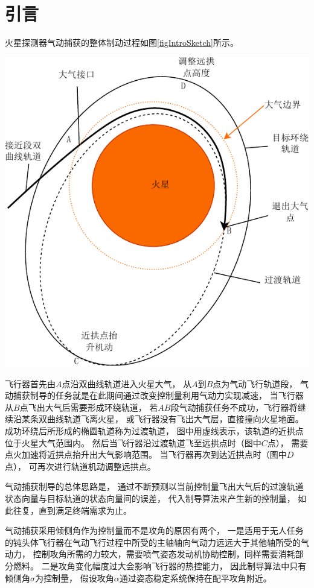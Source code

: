 \section{引\quad 言}
火星探测器气动捕获的整体制动过程如图\ref{figIntroSketch}所示。
\begin{center}
	\includegraphics[scale=0.8]{IntroSketch.pdf}  \\
	 \label{figIntroSketch}
\end{center}

飞行器首先由$A$点沿双曲线轨道进入火星大气，
从$A$到$B$点为气动飞行轨道段，
气动捕获制导的任务就是在此期间通过改变控制量利用气动力实现减速，
当飞行器从$B$点飞出大气后需要形成环绕轨道，
若$AB$段气动捕获任务不成功，飞行器将继续沿某条双曲线轨道飞离火星，
或飞行器没有飞出大气层，直接撞向火星地面。
成功环绕后所形成的椭圆轨道称为过渡轨道，
图中用虚线表示，该轨道的近拱点位于火星大气范围内。
然后当飞行器沿过渡轨道飞至远拱点时（图中$C$点），
需要点火加速将近拱点抬升出大气影响范围。
当飞行器再次到达近拱点时（图中$D$点），
可再次进行轨道机动调整远拱点。\cite{dqingyuan2019}

气动捕获制导的总体思路是，
通过不断预测以当前控制量飞出大气后的过渡轨道状态向量与目标轨道的状态向量间的误差，
代入制导算法来产生新的控制量，
如此往复，直到满足终端需求为止\cite{dqingyuan2019}。

气动捕获采用倾侧角作为控制量而不是攻角的原因有两个，
一是适用于无人任务的钝头体飞行器在气动飞行过程中所受的主轴轴向气动力远远大于其他轴所受的气动力，
控制攻角所需的力较大，需要喷气姿态发动机协助控制，同样需要消耗部分燃料。
二是攻角变化幅度过大会影响飞行器的热控能力，
因此制导算法中只有倾侧角$\sigma$为控制量，
假设攻角$\alpha$通过姿态稳定系统保持在配平攻角附近。
